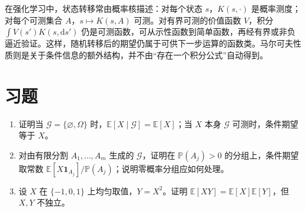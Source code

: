 在强化学习中，状态转移常由概率核描述：对每个状态 $s$，$K(s,\cdot)$ 是概率测度；对每个可测集合 $A$，$s\mapsto K(s,A)$ 可测。对有界可测的价值函数 $V$，积分 $\int V(s')K(s,\mathrm ds')$ 仍是可测函数，可从示性函数到简单函数，再经有界或非负逼近验证。这样，随机转移后的期望仍属于可供下一步运算的函数类。马尔可夫性质则是关于条件信息的额外结构，并不由“存在一个积分公式”自动得到。

\section{习题}
\begin{enumerate}
 \item 证明当 $\mathcal G=\{\varnothing,\Omega\}$ 时，$\mathbb E[X\mid\mathcal G]=\mathbb E[X]$；当 $X$ 本身 $\mathcal G$ 可测时，条件期望等于 $X$。
 \item 对由有限分割 $A_1,\ldots,A_m$ 生成的 $\mathcal G$，证明在 $\mathbb P(A_j)>0$ 的分组上，条件期望取常数 $\mathbb E[X\mathbf1_{A_j}]/\mathbb P(A_j)$；说明零概率分组应如何处理。
 \item 设 $X$ 在 $\{-1,0,1\}$ 上均匀取值，$Y=X^2$。证明 $\mathbb E[XY]=\mathbb E[X]\mathbb E[Y]$，但 $X,Y$ 不独立。
\end{enumerate}

